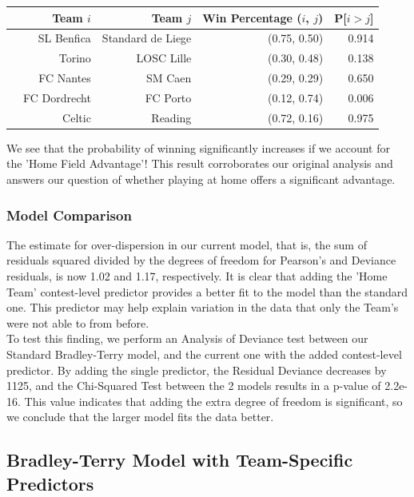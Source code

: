 \documentclass{article}
\begin{document}
\begin{table}[H]
\centering
\begin{tabular}{rrrrr}
  \hline
 & Team $i$ & Team $j$ & Win Percentage ($i$, $j$) & P[$i > j$] \\ 
  \hline
 & SL Benfica  & Standard de Liege & (0.75, 0.50) & 0.914 \\ 
   & Torino & LOSC Lille & (0.30, 0.48) & 0.138 \\ 
   & FC Nantes & SM Caen & (0.29, 0.29)  & 0.650 \\ 
   & FC Dordrecht & FC Porto & (0.12, 0.74) & 0.006 \\ 
   & Celtic & Reading & (0.72, 0.16) & 0.975 \\ 
   \hline
\end{tabular}
\end{table}

We see that the probability of winning significantly increases if we account for the 'Home Field Advantage'! This result corroborates our original analysis and answers our question of whether playing at home offers a significant advantage.\\

\subsubsection{Model Comparison}

The estimate for over-dispersion in our current model, that is, the sum of residuals squared divided by the degrees of freedom for Pearson's and Deviance residuals, is now 1.02 and 1.17, respectively. It is clear that adding the 'Home Team' contest-level predictor provides a better fit to the model than the standard one. This predictor may help explain variation in the data that only the Team's were not able to from before.\\

To test this finding, we perform an Analysis of Deviance test between our Standard Bradley-Terry model, and the current one with the added contest-level predictor. By adding the single predictor, the Residual Deviance decreases by 1125, and the Chi-Squared  Test between the 2 models results in a p-value of 2.2e-16. This value indicates that adding the extra degree of freedom is significant, so we conclude that the larger model fits the data better.

\subsection{Bradley-Terry Model with Team-Specific Predictors}
 
\end{document}
